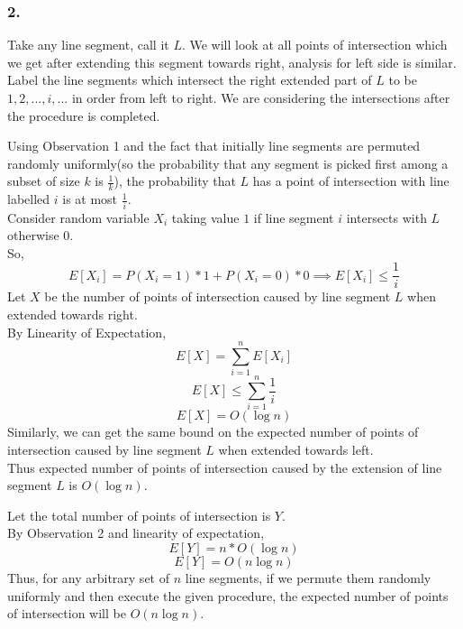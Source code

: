 \documentclass[a4paper]{article}
\begin{document}
\subsubsection*{2.}
Take any line segment, call it $L$. We will look at all points of intersection which we get after extending this segment towards right, analysis for left side is similar.\\
Label the line segments which intersect the right extended part of $L$ to be $1,2,...,i,...$ in order from left to right. We are considering the intersections after the procedure is completed.\\
\begin{warn}\end{warn}
Using Observation 1 and the fact that initially line segments are permuted randomly uniformly(so the probability that any segment is picked first among a subset of size $k$ is $\frac{1}{k}$), the probability that $L$ has a point of intersection with line labelled $i$ is at most $\frac{1}{i}$.\\
Consider random variable $X_i$ taking value $1$ if line segment $i$ intersects with $L$ otherwise $0$.\\
So, $$E[X_i] = P(X_i = 1)*1 + P(X_i = 0)*0 \implies E[X_i] \leq  \frac{1}{i}$$
Let $X$ be the number of points of intersection caused by line segment $L$ when extended towards right.\\
By Linearity of Expectation, 
$$E[X] = \sum_{i=1}^n E[X_i]$$
$$E[X] \leq \sum_{i=1}^n \frac{1}{i}$$
$$E[X] = O(\log n)$$
Similarly, we can get the same bound on the expected number of points of intersection caused by line segment $L$ when extended towards left.\\
Thus expected number of points of intersection caused by the extension of line segment $L$ is $O(\log n)$.\\
\begin{warn}\end{warn}
Let the total number of points of intersection is $Y$.\\
By Observation 2 and linearity of expectation,
$$E[Y] = n*O(\log n)$$
$$E[Y] = O(n\log n)$$
Thus, for any arbitrary set of $n$ line segments, if we permute them randomly uniformly and then execute the given procedure, the expected number of points of intersection will be $O(n \log n)$.
\pagebreak
\end{document}
